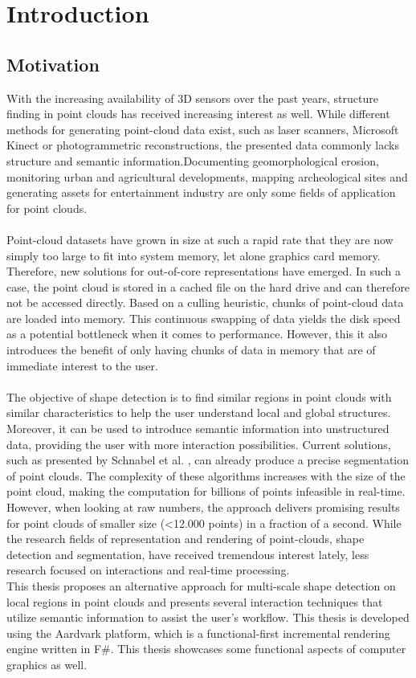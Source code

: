 \chapter{Introduction}

\section{Motivation}

With the increasing availability of 3D sensors over the past years, structure finding in point clouds has received increasing interest as well. While different methods for generating point-cloud data exist, such as laser scanners, Microsoft Kinect or photogrammetric reconstructions, the presented data commonly lacks structure and semantic information.Documenting geomorphological erosion, monitoring urban and agricultural developments, mapping archeological sites and generating assets for entertainment industry are only some fields of application for point clouds. 
\\
\\
Point-cloud datasets have grown in size at such a rapid rate that they are now simply too large to fit into system memory, let alone graphics card memory. Therefore, new solutions for out-of-core representations have emerged. In such a case, the point cloud is stored in a cached file on the hard drive and can therefore not be accessed directly. Based on a culling heuristic, chunks of point-cloud data are loaded into memory. This continuous swapping of data yields the disk speed as a potential bottleneck when it comes to performance. However, this it also introduces the benefit of only having chunks of data in memory that are of immediate interest to the user. 
\\
\\
The objective of shape detection is to find similar regions in point clouds with similar characteristics to help the user understand local and global structures. Moreover, it can be used to introduce semantic information into unstructured data, providing the user with more interaction possibilities. Current solutions, such as presented by Schnabel et al. \cite{schnabel-2007-efficient, schnabel-2007-ransac}, can already produce a precise segmentation of point clouds. The complexity of these algorithms increases with the size of the point cloud, making the computation for billions of points infeasible in real-time. However, when looking at raw numbers, the approach delivers promising results for point clouds of smaller size (<12.000 points) in a fraction of a second.
While the research fields of representation and rendering of point-clouds, shape detection and segmentation, have received tremendous interest lately, less research focused on interactions and real-time processing. 
\\
This thesis proposes an alternative approach for multi-scale shape detection on local regions in point clouds and presents several interaction techniques that utilize semantic information to assist the user's workflow. This thesis is developed using the Aardvark platform, which is a functional-first incremental rendering engine written in F\#. This thesis showcases some functional aspects of computer graphics as well. 


